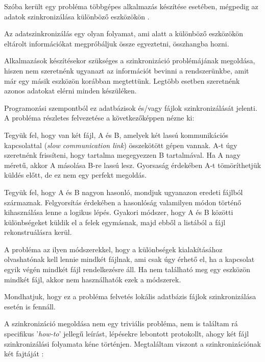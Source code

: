 

Szóba került egy probléma többgépes alkalmazás készítése esetében, mégpedig az adatok szinkronizálása különböző eszközökön \cite{nakatani2006data}.

Az adatszinkronizálás egy olyan folyamat, ami alatt a különböző eszközökön eltárolt információkat megpróbáljuk össze egyeztetni, összhangba hozni.

Alkalmazások készítésekor szükséges a szinkronizáció problémájának megoldása, hiszen nem szeretnénk ugyanazt az információt bevinni a rendszerünkbe, amit már egy másik eszközön korábban megtettünk. Legtöbb esetben szeretnénk azonos adatokat elérni minden készüléken.

Programozási szempontból ez adatbázisok és/vagy fájlok szinkronizálását jelenti.
\vspace{15pt} \\ A probléma részletes felvezetése a következőképpen nézne ki:

Tegyük fel, hogy van két fájl, A és B, amelyek két lassú kommunikációs kapcsolattal (\textit{slow communication link}) összekötött gépen vannak. A-t úgy szeretnénk frissíteni, hogy tartalma megegyezzen B tartalmával.  Ha A nagy méretű, akkor A másolása B-re lassú lesz. Gyorsaság érdekében A-t tömöríthetjük küldés előtt, de ez nem egy perfekt megoldás.

Tegyük fel, hogy A és B nagyon hasonló, mondjuk ugyanazon eredeti fájlból származnak. Felgyorsítás érdekében a hasonlóság valamilyen módon történő kihasználása lenne a logikus lépés. Gyakori módszer, hogy A és B közötti különbségeket küldik el a felek egymásnak, majd ebből a listából a fájl rekonstruálásra kerül. 

A probléma az ilyen módszerekkel, hogy a különbségek kialakításához olvashatónak kell lennie mindkét fájlnak, ami csak úgy érhető el, ha a kapcsolat egyik végén mindkét fájl rendelkezésre áll. Ha nem található meg egy eszközön mindkét fájl, akkor nem használhatók ezek a módszerek.

Mondhatjuk, hogy ez a probléma felvetés lokális adatbázis fájlok szinkronizálása esetén is fennáll.

A szinkronizáció megoldása nem egy triviális probléma, nem is találtam rá specifikus '\textit{how-to}' jellegű leírást, lépésekre lebontott protokollt, ahogy két fájl szinkronizálási folyamata kéne történjen.
Megtaláltam viszont a szinkronizációnak két fajtáját \cite{balaji2020blog}:

